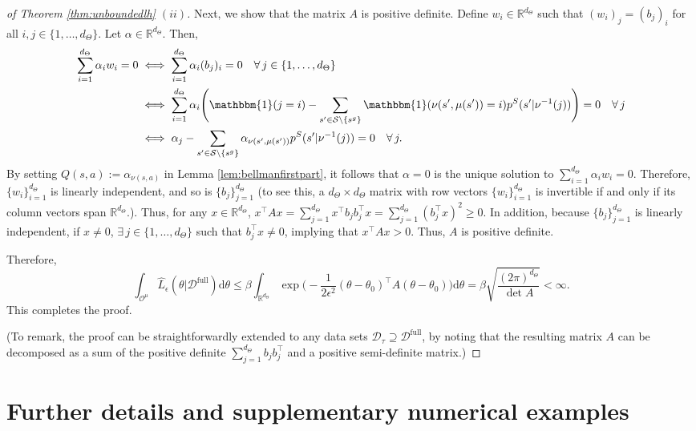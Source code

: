 \documentclass{amsart}
\begin{document}
\begin{proof}[of Theorem \ref{thm:unboundedlh} $(ii)$]
Next, we show that the matrix $A$ is positive definite. Define $w_i \in \mathbb{R}^{d_\Theta}$ such that $(w_{i})_j=(b_j)_i$ for all $i,j \in \{1,\dots,d_\Theta\}$. Let $\alpha \in \mathbb{R}^{d_\Theta}$. Then,
\begin{align*}
    \sum_{i=1}^{d_\Theta}\alpha_i w_i = 0 &\iff \sum_{i=1}^{d_\Theta} \alpha_i (b_{j})_i = 0 \quad \forall \, j\in \{1,\dots,d_{\Theta}\}\\
    &\iff \sum_{i=1}^{d_\Theta} \alpha_i \Bigg(\mathbbm{1}(j=i) - \sum_{s^\prime \in \mathcal{S} \setminus \{s^g\}} \mathbbm{1} (\nu(s^\prime, \mu(s^\prime)) = i) p^S(s^\prime|\nu^{-1}(j))\Bigg) = 0 \quad \forall \, j\\
    &\iff \alpha_j -\sum_{s^\prime \in \mathcal{S} \setminus \{s^g\}} \alpha_{\nu(s^\prime,\mu(s^\prime))} p^S(s^\prime|\nu^{-1}(j))=0 \quad \forall \, j.
\end{align*}
By setting $Q(s,a):= \alpha_{\nu(s,a)}$ in Lemma \ref{lem:bellmanfirstpart}, it follows that $\alpha=0$  is the unique solution to $\sum_{i=1}^{d_\Theta}\alpha_i w_i = 0$. Therefore, $\{w_i\}_{i=1}^{d_\Theta}$ is linearly independent, and so is  $\{b_j\}_{j=1}^{d_\Theta}$  (to see this, a $d_\Theta \times d_\Theta$ matrix with row vectors $\{w_i\}_{i=1}^{d_\Theta}$ is invertible if and only if its column vectors span $\mathbb{R}^{d_\Theta}$.). Thus, for any $x \in \mathbb{R}^{d_\Theta}$, $x^\top Ax=\sum_{j=1}^{d_\Theta} x^\top b_j b_j^\top x = \sum_{j=1}^{d_\Theta} (b_j^\top x)^2 \geq 0$. In addition, because $\{b_{j}\}_{j=1}^{d_\Theta}$ is linearly independent, if $x \neq 0$, $\exists \, j \in \{1,\dots,d_\Theta\}$ such that $b_j^\top x \neq 0$, implying that $x^\top Ax > 0$. Thus, $A$ is positive definite.

Therefore,
$$\int_{\mathcal{O}^\mu} \hat{L}_\epsilon(\theta|\mathcal{D}^{\mathrm{full}})\mathrm{d} \theta \leq \beta \int_{\mathbb{R}^{d_\Theta}} \exp\Bigg(-\frac{1}{2\epsilon^2} (\theta-\theta_0)^\top A (\theta-\theta_0)\Bigg)\mathrm{d} \theta = \beta \sqrt{ \frac{(2\pi)^{d_\Theta}}{\det{A}}} < \infty.$$
This completes the proof.

(To remark, the proof can be straightforwardly extended to any data sets $\mathcal{D}_\tau \supseteq \mathcal{D}^{\mathrm{full}}$, by noting that the resulting matrix $A$ can be decomposed as a sum of the positive definite $\sum_{j=1}^{d_\Theta} b_j b_j^\top$ and a positive semi-definite matrix.)
\end{proof}


\section{Further details and supplementary numerical examples}\label{apd:sec:numerical}
\end{document}
